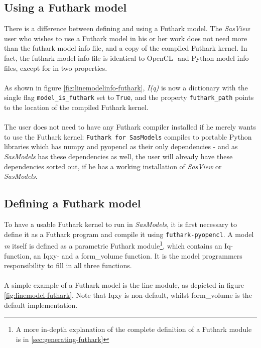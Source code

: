 \documentclass[11pt]{article}
\newcommand{\sasmodels}{\textit{SasModels}}
\newcommand{\sasview}{\textit{SasView}}
\newcommand{\iq}{\textit{I(q)}}
\newcommand{\futhark}{\texttt{Futhark for SasModels}}
\begin{document}
\subsection{Using a Futhark model}
\label{sec:using-futhark}
There is a difference between defining and using a Futhark model.
The \sasview{} user who wishes to use a Futhark model in his or her work does 
not need more than the futhark model info file, and a copy of the compiled
Futhark kernel. In fact, the futhark model info file is identical to OpenCL- 
and Python model info files, except for in two properties.
\\\\
As shown in figure \ref{fig:linemodelinfo-futhark}, \iq{} is now a dictionary
with the single flag \texttt{model\_is\_futhark} set to \texttt{True},
and the property \texttt{futhark\_path} points to the location of the compiled
Futhark kernel.
\\\\
The user does not need to have any Futhark compiler installed if he merely wants
to use the Futhark kernel: \futhark{} compiles to portable Python libraries which 
has numpy and pyopencl as their only dependencies - and as \sasmodels{} has these 
dependencies as well, the user will already have these dependencies sorted out, 
if he has a working installation of \sasview{} or \sasmodels{}.

\subsection{Defining a Futhark model}
\label{sec:defining-futhark-model}
To have a usable Futhark kernel to run in \sasmodels, it is first necessary to
define it as a Futhark program and compile it using \texttt{futhark-pyopencl}.
A model \textit{m} itself is defined as a parametric Futhark module\footnote{
  A more in-depth explanation of the complete definition of a Futhark module is 
  in \ref{sec:generating-futhark}},
which contains an Iq-function, an Iqxy- and a form\_volume function.
It is the model programmers responsibility to fill in all three functions.
\\\\
A simple example of a Futhark model is the line module, 
as depicted in figure \ref{fig:linemodel-futhark}.
Note that Iqxy is non-default, whilst form\_volume is the default 
implementation.
\end{document}
